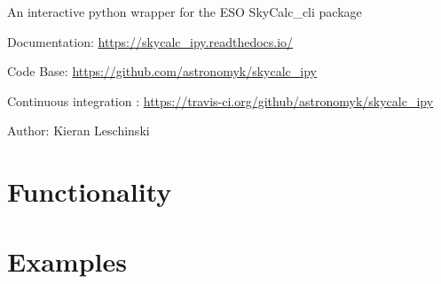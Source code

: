 
An interactive python wrapper for the ESO SkyCalc\_cli package

Documentation: \url{https://skycalc_ipy.readthedocs.io/}

Code Base: \url{https://github.com/astronomyk/skycalc_ipy}

Continuous integration : \url{https://travis-ci.org/github/astronomyk/skycalc_ipy}

Author: Kieran Leschinski


\section{Functionality%
  \label{functionality}%
}


\section{Examples%
  \label{examples}%
}
